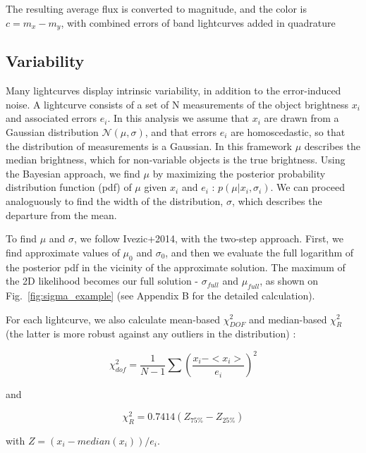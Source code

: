\documentclass[fleqn,usenatbib]{mnras}  %
\begin{document}
The resulting average flux is converted to magnitude, and the color is  $c = m_{x}-m_{y}$, with combined errors of band lightcurves added in quadrature

\subsection{Variability}

 
Many lightcurves display  intrinsic variability, in addition to the  error-induced noise. A lightcurve consists of a set of N measurements of the object brightness  $x_{i}$  and associated errors  $e_{i}$. In this analysis we assume that  $x_{i}$ are drawn from a Gaussian distribution  $\mathcal{N}(\mu,\sigma)$, and that errors $e_{i}$ are homoscedastic, so that  the distribution of measurements is a Gaussian.  In this framework $\mu$ describes the median brightness, which for non-variable objects is the true brightness.  Using the Bayesian approach, we find $\mu$  by maximizing  the posterior probability distribution function (pdf) of  $\mu$ given $x_{i}$ and $e_{i}$ : $p(\mu | {x_{i}},{\sigma_{i}})$.  We can proceed analoguously to find the width of the distribution, $\sigma$, which describes the  departure from the mean. 

To find $\mu$ and $\sigma$, we follow Ivezic+2014, with the two-step approach. First, we find approximate values of  $\mu_{0}$ and $\sigma_{0}$, and then we evaluate the full logarithm of the posterior pdf in the vicinity of the approximate solution. The maximum of the 2D likelihood becomes our full solution - $\sigma_{full}$ and $\mu_{full}$, as shown on Fig.~\ref{fig:sigma_example} (see Appendix B for the detailed calculation). 

For each lightcurve, we also calculate mean-based $\chi^{2}_{DOF}$ and median-based $\chi^{2}_{R}$ (the latter is more robust against any outliers in the distribution) : 

\begin{equation}
\label{eqn:chi2DOF}
\chi^{2}_{dof} = \frac{1}{N-1}\sum{\left( \frac{x_{i} - <x_{i}>} {e_{i}} \right) ^{2}}
\end{equation}

\noindent and
 
\begin{equation}
\label{eqn:chi2R}
\chi^{2}_{R} = 0.7414 (Z_{75\%} - Z_{25\%} ) 
\end{equation}

\noindent with $Z=(x_{i} - median(x_{i})) / e_{i} $. 
\end{document}
